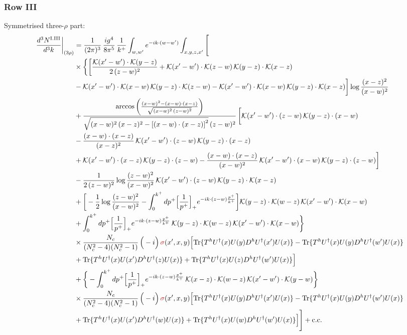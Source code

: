\documentclass[9pt]{article}
\numberwithin{equation}{section}
\begin{document}
\subsubsection*{Row III}
Symmetrised three-$\rho$ part:
\begin{align}
\frac{d^{3}N^{\rm I.III}}{d^{3}k}\bigg|_{(3\rho)}&=\frac{1}{(2\pi)^{3}}\,\frac{ig^{4}}{8\pi^{5}}\,\frac{1}{k^{+}}\int_{w,w'}e^{-ik\cdot(w-w')}\int_{x,y,z,x'}\Bigg[\notag\\
&\times\bigg\{\bigg[\frac{\mathcal{K}(x'-w')\cdot\mathcal{K}(y-z)}{2\,(z-w)^{2}}+\mathcal{K}(x'-w')\cdot\mathcal{K}(z-w)\,\mathcal{K}(y-z)\cdot\mathcal{K}(x-z)\notag\\
&-\mathcal{K}(x'-w')\cdot\mathcal{K}(x-w)\,\mathcal{K}(y-z)\cdot\mathcal{K}(z-w)-\mathcal{K}(x'-w')\cdot\mathcal{K}(x-w)\,\mathcal{K}(y-z)\cdot\mathcal{K}(x-z)\bigg]\log\frac{(x-z)^{2}}{(x-w)^{2}}\notag\\
&+\frac{\arccos\left(\frac{(x-w)^{2}-(x-w)\cdot (x-z)}{\sqrt{(x-w)^{2}\,(z-w)^{2}}}\right)}{\sqrt{(x-w)^{2}\,(x-z)^{2}-\left[(x-w)\cdot (x-z)\right]^{2}}\,(z-w)^{2}}\,\bigg[\mathcal{K}(x'-w')\cdot(z-w)\,\mathcal{K}(y-z)\cdot(x-w)\notag\\
&-\frac{(x-w)\cdot(x-z)}{(x-z)^{2}}\,\mathcal{K}(x'-w')\cdot(z-w)\,\mathcal{K}(y-z)\cdot(x-z)\notag\\
&+\mathcal{K}(x'-w')\cdot(x-z)\,\mathcal{K}(y-z)\cdot(z-w)-\frac{(x-w)\cdot(x-z)}{(x-w)^{2}}\,\mathcal{K}(x'-w')\cdot(x-w)\,\mathcal{K}(y-z)\cdot(z-w)\bigg]\notag\\
&-\frac{1}{2\,(z-w)^{2}}\log\frac{(z-w)^{2}}{(x-w)^{2}}\,\mathcal{K}(x'-w')\cdot(z-w)\,\mathcal{K}(y-z)\cdot\mathcal{K}(x-z)\notag\\
&+\bigg[-\frac{1}{2}\log\frac{(z-w)^{2}}{(x-w)^{2}}-\int_{0}^{k^{+}}dp^{+}\Big[\frac{1}{p^{+}}\Big]_{+}e^{-ik\cdot(z-w)\frac{p^{+}}{k^{+}}}\bigg]\mathcal{K}(y-z)\cdot\mathcal{K}(w-z)\,\mathcal{K}(x'-w')\cdot\mathcal{K}(x-w)\notag\\
&+\int_{0}^{k^{+}}dp^{+}\Big[\frac{1}{p^{+}}\Big]_{+}e^{-ik\cdot(z-w)\frac{p^{+}}{k^{+}}}\,\mathcal{K}(y-z)\cdot\mathcal{K}(w-z)\,\mathcal{K}(x'-w')\cdot\mathcal{K}(x-w)\bigg\}\notag\\
&\times \frac{N_{c}}{(N_{c}^{2}-4)(N_{c}^{2}-1)}\,\Big(-i\Big)\,{\color{red}\sigma}(x',x,y)\Big[{\rm Tr}\{T^{h}U^{\dagger}(x)U(y)D^{h}U^{\dagger}(x')U(x)\}-{\rm Tr}\{T^{h}U^{\dagger}(x)U(y)D^{h}U^{\dagger}(w')U(x)\}\notag\\
& +{\rm Tr}\{T^{h}U^{\dagger}(x)U(x')D^{h}U^{\dagger}(z)U(x)\}+{\rm Tr}\{T^{h}U^{\dagger}(x)U(z)D^{h}U^{\dagger}(w')U(x)\}\Big]\notag\\
&+\bigg\{-\int_{0}^{k^{+}}dp^{+}\Big[\frac{1}{p^{+}}\Big]_{+}e^{-ik\cdot(z-w)\frac{p^{+}}{k^{+}}}\,\mathcal{K}(x-z)\cdot\mathcal{K}(w-z)\,\mathcal{K}(x'-w')\cdot\mathcal{K}(y-w)\bigg\}\notag\\
&\times \frac{N_{c}}{(N_{c}^{2}-4)(N_{c}^{2}-1)}\,\Big(-i\Big)\,{\color{red}\sigma}(x',x,y)\Big[{\rm Tr}\{T^{h}U^{\dagger}(x)U(y)D^{h}U^{\dagger}(x')U(x)\}-{\rm Tr}\{T^{h}U^{\dagger}(x)U(y)D^{h}U^{\dagger}(w')U(x)\}\notag\\
& +{\rm Tr}\{T^{h}U^{\dagger}(x)U(x')D^{h}U^{\dagger}(w)U(x)\}+{\rm Tr}\{T^{h}U^{\dagger}(x)U(w)D^{h}U^{\dagger}(w')U(x)\}\Big]\Bigg]+{\rm c.c.}\label{eq:E-I.III-3}
\end{align}
\end{document}
